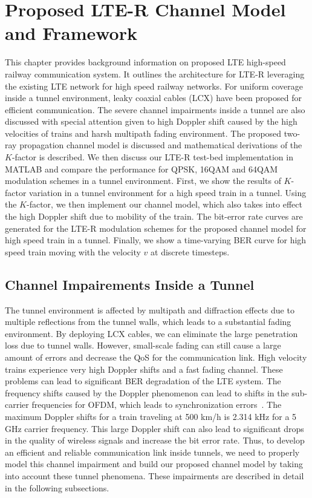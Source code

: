 \chapter{Proposed LTE-R Channel Model and Framework}
\label{chapter4}

This chapter provides background information on proposed LTE high-speed railway communication system. It outlines the architecture for LTE-R leveraging the existing LTE network for high speed railway networks. For uniform coverage inside a tunnel environment, leaky coaxial cables (LCX) have been proposed for efficient communication. The severe channel impairments inside a tunnel are also discussed with special attention given to high Doppler shift caused by the high velocities of trains and harsh multipath fading environment. The proposed two-ray propagation channel model is discussed and mathematical derivations of the $K$-factor is described. We then discuss our LTE-R test-bed implementation in MATLAB and compare the performance for QPSK, 16QAM and 64QAM modulation schemes in a tunnel environment. First, we show the results of $K$-factor variation in a tunnel environment for a high speed train in a tunnel. Using the $K$-factor, we then implement our channel model, which also takes into effect the high Doppler shift due to mobility of the train. The bit-error rate curves are generated for the LTE-R modulation schemes for the proposed channel model for high speed train in a tunnel. Finally, we show a time-varying BER curve for high speed train moving with the velocity $v$ at discrete timesteps.


\section{Channel Impairements Inside a Tunnel}
The tunnel environment is affected by multipath and diffraction effects due to multiple reflections from the tunnel walls, which leads to a substantial fading environment. By deploying LCX cables, we can eliminate the large penetration loss due to tunnel walls. However, small-scale fading can still cause a large amount of errors and decrease the QoS for the communication link. High velocity trains experience very high Doppler shifts and a fast fading channel. These problems can lead to significant BER degradation of the LTE system. The frequency shifts caused by the Doppler phenomenon can lead to shifts in the sub-carrier frequencies for OFDM, which leads to synchronization errors~\cite{inplter9}. The maximum Doppler shifts for a train traveling at 500 km/h is 2.314 kHz for a 5 GHz carrier frequency. This large Doppler shift can also lead to significant drops in the quality of wireless signals and increase the bit error rate. Thus, to develop an efficient and reliable communication link inside tunnels, we need to properly model this channel impairment and build our proposed channel model by taking into account these tunnel phenomena. These impairments are described in detail in the following subsections.

